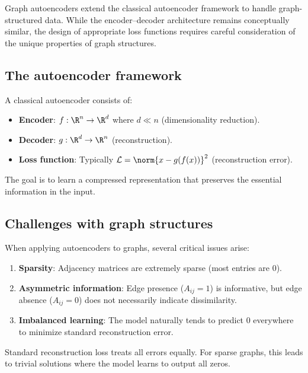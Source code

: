 \begin{notechapter}
Graph autoencoders extend the classical autoencoder framework to handle graph-structured data. While the encoder--decoder architecture remains conceptually similar, the design of appropriate loss functions requires careful consideration of the unique properties of graph structures.

\subsection{The autoencoder framework}

A classical autoencoder consists of:
\begin{itemize}
    \item \textbf{Encoder}: $f: \R^n \to \R^d$ where $d \ll n$ (dimensionality reduction).
    \item \textbf{Decoder}: $g: \R^d \to \R^n$ (reconstruction).
    \item \textbf{Loss function}: Typically $\mathcal{L} = \norm{x - g(f(x))}^2$ (reconstruction error).
\end{itemize}

The goal is to learn a compressed representation that preserves the essential information in the input.

\subsection{Challenges with graph structures}

When applying autoencoders to graphs, several critical issues arise:

\begin{enumerate}
    \item \textbf{Sparsity}: Adjacency matrices are extremely sparse (most entries are 0).
    \item \textbf{Asymmetric information}: Edge presence ($A_{ij} = 1$) is informative, but edge absence ($A_{ij} = 0$) does not necessarily indicate dissimilarity.
    \item \textbf{Imbalanced learning}: The model naturally tends to predict 0 everywhere to minimize standard reconstruction error.
\end{enumerate}

\begin{keyidea}
Standard reconstruction loss treats all errors equally. For sparse graphs, this leads to trivial solutions where the model learns to output all zeros.
\end{keyidea}


\end{notechapter}
